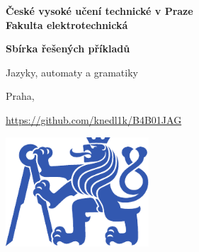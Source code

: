 \documentclass[11pt,a4paper]{article}
\begin{document}
 


\begin{titlepage}
    \centering
    \vspace*{2cm}

    {\Large \textbf{České vysoké učení technické v Praze}\\}
    \vspace{0.2cm}
    {\Large \textbf{Fakulta elektrotechnická}\\}
    
    \vspace{1cm}
    {\Huge \textbf{Sbírka řešených příkladů}\\}

    \vspace{0.5cm}
    {\Large Jazyky, automaty a gramatiky\\}

    \vspace{2cm}
    { Praha, \the\year\\}

    \vspace{2cm}
    { \url{https://github.com/knedl1k/B4B01JAG}}

    \vspace{2cm}
    \includegraphics[width=0.4\textwidth]{media/symbol_cvut_plna_samostatna_verze_Pantone.pdf}

    \vfill
    
\end{titlepage}

\clearpage
{}
\setcounter{page}{1}

\tableofcontents
{}

\clearpage
{}
\setcounter{page}{1} 






 
\end{document}
